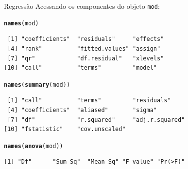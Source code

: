 \documentclass[10pt]{beamer}\usepackage[]{graphicx}\usepackage[]{color}
\makeatletter
\newcommand{\hlstd}[1]{\textcolor[rgb]{0.345,0.345,0.345}{#1}}%
\newcommand{\hlkwd}[1]{\textcolor[rgb]{0.737,0.353,0.396}{\textbf{#1}}}%
\newenvironment{kframe}{%
 \def\at@end@of@kframe{}%
 \ifinner\ifhmode%
  \def\at@end@of@kframe{\end{minipage}}%
  \begin{minipage}{\columnwidth}%
 \fi\fi%
 \def\FrameCommand##1{\hskip\@totalleftmargin \hskip-\fboxsep
 \colorbox{shadecolor}{##1}\hskip-\fboxsep
     \hskip-\linewidth \hskip-\@totalleftmargin \hskip\columnwidth}%
 \MakeFramed {\advance\hsize-\width
   \@totalleftmargin\z@ \linewidth\hsize
   \@setminipage}}%
 {\par\unskip\endMakeFramed%
 \at@end@of@kframe}
\newenvironment{knitrout}{}{} %
\theoremstyle{definition}
\makeatother
\begin{document}
\begin{frame}[fragile]{Regressão}
Acessando os componentes do objeto \texttt{mod}:
\begin{knitrout}\footnotesize
{}\color{fgcolor}\begin{kframe}
\begin{alltt}
\hlkwd{names}\hlstd{(mod)}
\end{alltt}
\begin{verbatim}
 [1] "coefficients"  "residuals"     "effects"      
 [4] "rank"          "fitted.values" "assign"       
 [7] "qr"            "df.residual"   "xlevels"      
[10] "call"          "terms"         "model"        
\end{verbatim}
\begin{alltt}
\hlkwd{names}\hlstd{(}\hlkwd{summary}\hlstd{(mod))}
\end{alltt}
\begin{verbatim}
 [1] "call"          "terms"         "residuals"    
 [4] "coefficients"  "aliased"       "sigma"        
 [7] "df"            "r.squared"     "adj.r.squared"
[10] "fstatistic"    "cov.unscaled" 
\end{verbatim}
\begin{alltt}
\hlkwd{names}\hlstd{(}\hlkwd{anova}\hlstd{(mod))}
\end{alltt}
\begin{verbatim}
[1] "Df"      "Sum Sq"  "Mean Sq" "F value" "Pr(>F)" 
\end{verbatim}
\end{kframe}
\end{knitrout}
\end{frame}
\end{document}
